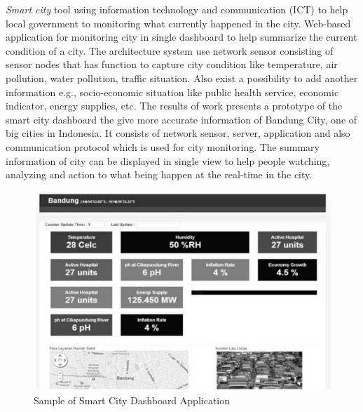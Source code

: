 	\emph{Smart city}\cite{6588063} tool using information technology and communication (ICT) to help local government to monitoring what currently happened in the city. Web-based application for monitoring city in single dashboard to help summarize the current condition of a city. The architecture system use network sensor consisting of sensor nodes that has function to capture city condition like temperature, air pollution, water pollution, traffic situation. Also exist a possibility to add another information e.g., socio-economic situation like public health service, economic indicator, energy supplies, etc. The results of work presents a prototype of the smart city dashboard the give more accurate information of Bandung City, one of big cities in Indonesia. It consists of network sensor, server, application and also communication protocol which is used for city monitoring. The summary information of city can be displayed in single view to help people watching, analyzing and action to what being happen at the real-time in the city.
	  \begin{figure}[!ht]
		\centering
		\includegraphics[scale=0.4]{Material/examples/SmartCity.png}   
		\caption[Sample of Smart City Dashboard Application]{Sample of Smart City Dashboard Application}                  
		\end{figure}

